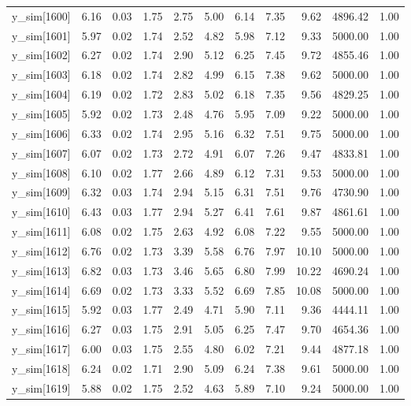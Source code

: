 \begin{table}[ht]
\begin{tabular}{rrrrrrrrrrr}
  y\_sim[1600] & 6.16 & 0.03 & 1.75 & 2.75 & 5.00 & 6.14 & 7.35 & 9.62 & 4896.42 & 1.00 \\ 
  y\_sim[1601] & 5.97 & 0.02 & 1.74 & 2.52 & 4.82 & 5.98 & 7.12 & 9.33 & 5000.00 & 1.00 \\ 
  y\_sim[1602] & 6.27 & 0.02 & 1.74 & 2.90 & 5.12 & 6.25 & 7.45 & 9.72 & 4855.46 & 1.00 \\ 
  y\_sim[1603] & 6.18 & 0.02 & 1.74 & 2.82 & 4.99 & 6.15 & 7.38 & 9.62 & 5000.00 & 1.00 \\ 
  y\_sim[1604] & 6.19 & 0.02 & 1.72 & 2.83 & 5.02 & 6.18 & 7.35 & 9.56 & 4829.25 & 1.00 \\ 
  y\_sim[1605] & 5.92 & 0.02 & 1.73 & 2.48 & 4.76 & 5.95 & 7.09 & 9.22 & 5000.00 & 1.00 \\ 
  y\_sim[1606] & 6.33 & 0.02 & 1.74 & 2.95 & 5.16 & 6.32 & 7.51 & 9.75 & 5000.00 & 1.00 \\ 
  y\_sim[1607] & 6.07 & 0.02 & 1.73 & 2.72 & 4.91 & 6.07 & 7.26 & 9.47 & 4833.81 & 1.00 \\ 
  y\_sim[1608] & 6.10 & 0.02 & 1.77 & 2.66 & 4.89 & 6.12 & 7.31 & 9.53 & 5000.00 & 1.00 \\ 
  y\_sim[1609] & 6.32 & 0.03 & 1.74 & 2.94 & 5.15 & 6.31 & 7.51 & 9.76 & 4730.90 & 1.00 \\ 
  y\_sim[1610] & 6.43 & 0.03 & 1.77 & 2.94 & 5.27 & 6.41 & 7.61 & 9.87 & 4861.61 & 1.00 \\ 
  y\_sim[1611] & 6.08 & 0.02 & 1.75 & 2.63 & 4.92 & 6.08 & 7.22 & 9.55 & 5000.00 & 1.00 \\ 
  y\_sim[1612] & 6.76 & 0.02 & 1.73 & 3.39 & 5.58 & 6.76 & 7.97 & 10.10 & 5000.00 & 1.00 \\ 
  y\_sim[1613] & 6.82 & 0.03 & 1.73 & 3.46 & 5.65 & 6.80 & 7.99 & 10.22 & 4690.24 & 1.00 \\ 
  y\_sim[1614] & 6.69 & 0.02 & 1.73 & 3.33 & 5.52 & 6.69 & 7.85 & 10.08 & 5000.00 & 1.00 \\ 
  y\_sim[1615] & 5.92 & 0.03 & 1.77 & 2.49 & 4.71 & 5.90 & 7.11 & 9.36 & 4444.11 & 1.00 \\ 
  y\_sim[1616] & 6.27 & 0.03 & 1.75 & 2.91 & 5.05 & 6.25 & 7.47 & 9.70 & 4654.36 & 1.00 \\ 
  y\_sim[1617] & 6.00 & 0.03 & 1.75 & 2.55 & 4.80 & 6.02 & 7.21 & 9.44 & 4877.18 & 1.00 \\ 
  y\_sim[1618] & 6.24 & 0.02 & 1.71 & 2.90 & 5.09 & 6.24 & 7.38 & 9.61 & 5000.00 & 1.00 \\ 
  y\_sim[1619] & 5.88 & 0.02 & 1.75 & 2.52 & 4.63 & 5.89 & 7.10 & 9.24 & 5000.00 & 1.00 \\ 

\end{tabular}
\end{table}
